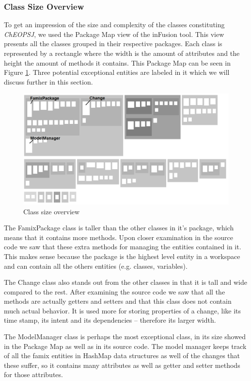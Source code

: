 \documentclass[a4paper]{article}
\begin{document}
\subsubsection{Class Size Overview}
To get an impression of the size and complexity of the classes constituting \emph{ChEOPSJ}, we used the Package Map view of the inFusion tool. This view presents all the classes grouped in their respective packages. Each class is represented by a rectangle where the width is the amount of attributes and the height the amount of methods it contains. This Package Map can be seen in Figure \ref{fig:sizeOverview}. Three potential exceptional entities are labeled in it which we will discuss further in this section.

\begin{figure}[h]
\centering
\includegraphics[width=1\textwidth]{Images/classSizeOverview}
\caption{Class size overview}
\label{fig:sizeOverview}
\end{figure}

The FamixPackage class is taller than the other classes in it's package, which means that it contains more methods. Upon closer examination in the source code we saw that these extra methods for managing the entities contained in it. This makes sense because the package is the highest level entity in a workspace and can contain all the others entities (e.g. classes, variables).

The Change class also stands out from the other classes in that it is tall and wide compared to the rest. After examining the source code we saw that all the methods are actually getters and setters and that this class does not contain much actual behavior. It is used more for storing properties of a change, like its time stamp, its intent and its dependencies -- therefore its larger width.

The ModelManager class is perhaps the most exceptional class, in its size showed in the Package Map as well as in its source code. The model manager keeps track of all the famix entities in HashMap data structures as well of the changes that these suffer, so it contains many attributes as well as getter and setter methods for those attributes. 
\end{document}

